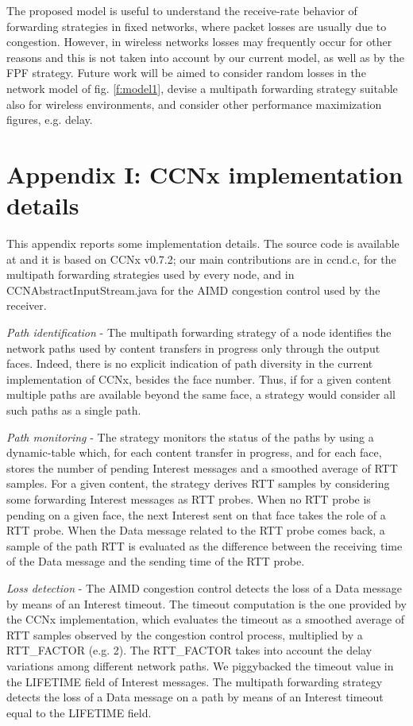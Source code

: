 \documentclass{sig-alternate-10pt}
\begin{document}
The proposed model is useful to understand the receive-rate behavior of forwarding strategies in fixed networks, where packet losses are usually due to congestion. However, in wireless networks losses may frequently occur for other reasons and this is not taken into account by our current model, as well as by the FPF strategy. 
Future work will be aimed to consider random losses in the network model of fig. \ref{f:model1}, devise a multipath forwarding strategy suitable also for wireless environments, and consider other performance maximization figures, e.g. delay.






\section*{Appendix I: CCNx implementation details}

This appendix reports some implementation details. The source code is available at \cite{software} and it is based on CCNx v0.7.2; our main contributions are in ccnd.c, for the multipath forwarding strategies used by every node, and in CCNAbstractInputStream.java for the AIMD congestion control used by the receiver.

\emph{Path identification} -  The multipath forwarding strategy of a node identifies the network paths used by content transfers in progress only through the output faces. Indeed, there is no explicit indication of path diversity in the current implementation of CCNx, besides the face number. Thus, if for a given content multiple paths are available beyond the same face, a strategy would consider all such paths as a single path. 

\emph{Path monitoring} - The strategy monitors the status of the paths by using a dynamic-table which, for each content transfer in progress, and for each face, stores the number of pending Interest messages and a smoothed average of RTT samples. For a given content, the strategy derives RTT samples by considering some forwarding Interest messages as RTT probes. When no RTT probe is pending on a given face, the next Interest sent on that face takes the role of a RTT probe. When the Data message related to the RTT probe comes back, a sample of the path RTT is evaluated as the difference between the receiving time of the Data message and the sending time of the RTT probe.

\emph{Loss detection} -  The AIMD congestion control detects the loss of a Data message by means of an Interest timeout. The timeout computation is the one provided by the CCNx implementation, which evaluates the timeout as a smoothed average of RTT samples observed by the congestion control process, multiplied by a RTT\_FACTOR (e.g. 2). The RTT\_FACTOR takes into account the delay variations among different network paths. We piggybacked the timeout value in the LIFETIME field of Interest messages. The multipath forwarding strategy detects the loss of a Data message on a path by means of an Interest timeout equal to the LIFETIME field. 
\end{document}
